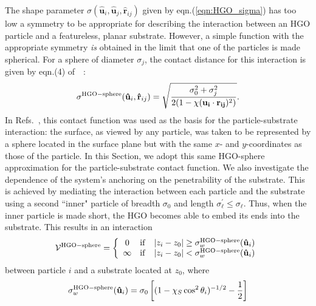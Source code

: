\documentclass[aps,10pt,twocolumn]{revtex4}
\newcommand{\vect}[1]{ \mathbf{#1} }
\newcommand{\vecth}[1]{ \mathbf{\hat{#1} } }
\newcommand{\dotproduct}[2]{\vect{#1} \cdot \vect{#2}   }
\newcommand{\lp}{\left(}
\newcommand{\rp}{\right)}
\newcommand{\so}{\sigma_0}
\newcommand{\sel}{\sigma_\ell}
\newcommand{\rij}{\vecth{r}_{ij}}
\newcommand{\ui}{\vecth{u}_i}
\newcommand{\uj}{\vecth{u}_j}
\newcommand{\sijr}{\sigma(\ui,\uj,\rij)}
\begin{document}
The shape parameter $\sijr$ given by eqn.(\ref{eqn:HGO_sigma}) has too low a symmetry to be appropriate for
describing the interaction between an HGO particle and a featureless, planar substrate. However, a simple function
with the appropriate symmetry {\em is} obtained in the limit that one of the particles is made spherical. For a
sphere of diameter $\sigma_j$, the contact distance for this interaction is given by eqn.(4)
of~\cite{BernePechukas72}~:
%
\begin{equation}
    \sigma^{\rm HGO-sphere}(\ui,\rij) = \sqrt{
    \frac{\so^2 + \sigma^2_j}
    {2(1 - \chi(\dotproduct{u_i}{r_{ij}})^2 )}
    }.
    \label{eqn:sw_RSP_BP}
\end{equation}
%
In Refs.~\cite{ZhangChakrabarti96,WallCleaver97,TeixeiraChrzanowska01,WebsterCleaver03}, this contact function was
used as the basis for the particle-substrate interaction: the surface, as viewed by any particle, was taken to be
represented by a sphere located in the surface plane but with the same $x$- and $y$-coordinates as those of the
particle. In this Section, we adopt this same HGO-sphere approximation for the particle-substrate contact
function. We also investigate the dependence of the system's anchoring on the penetrability of the substrate. This
is achieved by mediating the interaction between each particle and the substrate using a second ``inner" particle
of breadth $\so$ and length $\sel^{\prime} \leq \sel$. Thus, when the inner particle is made short, the HGO
becomes able to embed its ends into the substrate. This results in an interaction
%
\begin{equation}
    \mathcal{V}^{\rm HGO-sphere} = \left\{
    \begin{array}{ccc}
        0   &\mathrm{if}    &|z_i - z_0| \geq \sigma^{\rm HGO-sphere}_w(\ui)    \\
        \infty  &\mathrm{if}    &|z_i - z_0| < \sigma^{\rm HGO-sphere}_w(\ui)
    \end{array}
    \right.
\end{equation}
%
between particle $i$ and a substrate located at $z_0$, where
\begin{equation}
    \sigma^{\rm HGO-sphere}_w(\ui) = \sigma_0\left[ (1 - \chi_S\cos^2\theta_i)^{-1/2} - \frac{1}{2} \right]
    \label{eqn:sigma_w_RSP}
\end{equation}
\end{document}
